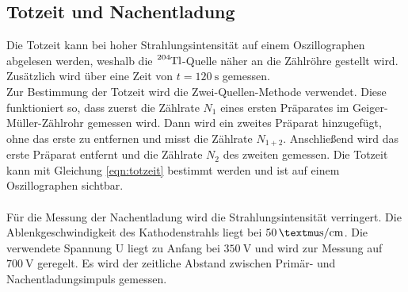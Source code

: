 \subsection{Totzeit und Nachentladung}

    Die Totzeit kann bei hoher Strahlungsintensität auf einem Oszillographen abgelesen werden,
    weshalb die $\ce{^204Tl}$-Quelle näher an die Zählröhre gestellt wird. 
    Zusätzlich wird über eine Zeit von $t = \SI{120}{\second}$ gemessen. \\
    Zur Bestimmung der Totzeit wird die Zwei-Quellen-Methode verwendet. 
    Diese funktioniert so, dass zuerst die Zählrate $N_1$ eines ersten Präparates im
    Geiger-Müller-Zählrohr gemessen wird. 
    Dann wird ein zweites Präparat hinzugefügt, ohne das erste zu entfernen und misst
    die Zählrate $N_{1+2}$.
    Anschließend wird das erste Präparat entfernt und die Zählrate $N_2$ des zweiten 
    gemessen.
    Die Totzeit kann mit Gleichung \eqref{eqn:totzeit} bestimmt werden und ist auf 
    einem Oszillographen sichtbar.\\
    \\
    Für die Messung der Nachentladung wird die Strahlungsintensität verringert.
    Die Ablenkgeschwindigkeit des Kathodenstrahls liegt bei $\SI{50}{\textmu\second\per\centi\meter}$.
    Die verwendete Spannung U liegt zu Anfang bei $\SI{350}{\volt}$ und wird zur Messung auf
    $\SI{700}{\volt}$ geregelt. Es wird der zeitliche Abstand zwischen Primär- und Nachentladungsimpuls
    gemessen.









